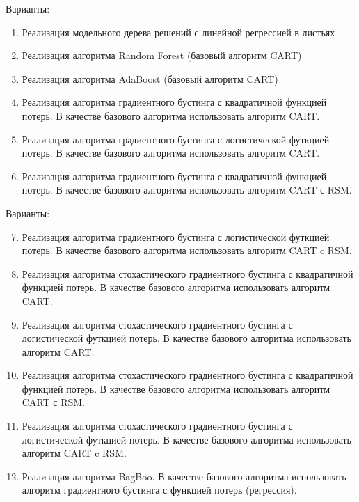 \documentclass[10pt]{beamer}
\begin{document}
\begin{frame}[fragile]{Варианты:}
\begin{enumerate}
    \item Реализация модельного дерева решений с линейной регрессией в листьях
    \item Реализация алгоритма Random Forest (базовый алгоритм CART)
    \item Реализация алгоритма AdaBoost (базовый алгоритм CART)
    \item Реализация алгоритма градиентного бустинга с квадратичной функцией
        потерь. В качестве базового алгоритма использовать алгоритм CART.
    \item Реализация алгоритма градиентного бустинга с логистической футкцией
        потерь. В качестве базового алгоритма использовать алгоритм CART.
    \item Реализация алгоритма градиентного бустинга с квадратичной функцией
        потерь. В качестве базового алгоритма использовать алгоритм CART с RSM.
\end{enumerate}
\end{frame}

\begin{frame}[fragile]{Варианты:}
\begin{enumerate}
    \setcounter{enumi}{6}
    \item Реализация алгоритма градиентного бустинга с логистической футкцией
        потерь. В качестве базового алгоритма использовать алгоритм CART c RSM.
    \item Реализация алгоритма стохастического градиентного бустинга с
        квадратичной функцией потерь. В качестве базового алгоритма
        использовать алгоритм CART.
    \item Реализация алгоритма стохастического градиентного бустинга с
        логистической футкцией потерь. В качестве базового алгоритма
        использовать алгоритм CART.
    \item Реализация алгоритма стохастического градиентного бустинга с
        квадратичной функцией потерь. В качестве базового алгоритма
        использовать алгоритм CART с RSM.
    \item Реализация алгоритма стохастического градиентного бустинга с
        логистической футкцией потерь. В качестве базового алгоритма
        использовать алгоритм CART c RSM.
    \item Реализация алгоритма BagBoo. В качестве базового алгоритма
        использовать алгоритм градиентного бустинга с функцией потерь
        (регрессия).
\end{enumerate}
\end{frame}
\end{document}
